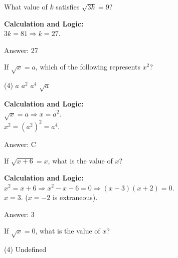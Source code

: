 \documentclass[11pt,paper=a4,answers]{exam}
\begin{document}
\begin{questions}
\vspace{40pt}

\question
What value of $k$ satisfies $\sqrt{3k} = 9$?

\begin{solution}
\textbf{Calculation and Logic:} \\
$3k = 81 \Rightarrow k = 27$.

\vspace{25pt}

Answer: \colorbox{yellow!100}{27}
\end{solution}

\vspace{40pt}

\question
If $\sqrt{x} = a$, which of the following represents $x^2$?
\begin{tasks}(4)
    \task $a$
    \task $a^2$
    \task $a^4$
    \task $\sqrt{a}$
\end{tasks}

\begin{solution}
\textbf{Calculation and Logic:} \\
$\sqrt{x} = a \Rightarrow x = a^2$. \\
$x^2 = (a^2)^2 = a^4$.

\vspace{25pt}

Answer: \colorbox{yellow!100}{C}
\end{solution}

\vspace{40pt}

\question
If $\sqrt{x+6} = x$, what is the value of $x$?

\begin{solution}
\textbf{Calculation and Logic:} \\
$x^2 = x + 6 \Rightarrow x^2 - x - 6 = 0 \Rightarrow (x-3)(x+2) = 0$. \\
$x = 3$. ($x = -2$ is extraneous).

\vspace{25pt}

Answer: \colorbox{yellow!100}{3}
\end{solution}

\vspace{40pt}

\question
If $\sqrt{x} = 0$, what is the value of $x$?
\begin{tasks}(4)
    \task Undefined
\end{tasks}


\end{questions}
\end{document}
